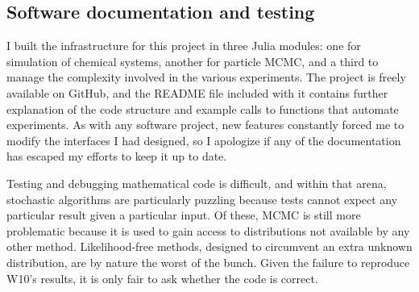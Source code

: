 \documentclass{article}
\begin{document}
%



\subsection{Software documentation and testing}
I built the infrastructure for this project in three Julia modules: one for simulation of chemical systems, another for particle MCMC, and a third to manage the complexity involved in the various experiments. The project is freely available on GitHub, and the README file included with it contains further explanation of the code structure and example calls to functions that automate experiments. As with any software project, new features constantly forced me to modify the interfaces I had designed, so I apologize if any of the documentation has escaped my efforts to keep it up to date.

Testing and debugging mathematical code is difficult, and within that arena, stochastic algorithms are particularly puzzling because tests cannot expect any particular result given a particular input. Of these, MCMC is still more problematic because it is used to gain access to distributions not available by any other method. Likelihood-free methods, designed to circumvent an extra unknown distribution, are by nature the worst of the bunch. Given the failure to reproduce W10's results, it is only fair to ask whether the code is correct. 
\end{document}
